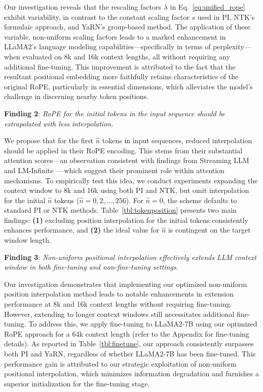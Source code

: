 Our investigation reveals that the rescaling factors $\lambda$ in Eq.~\ref{eq:unified_rope} exhibit variability, in contrast to the constant scaling factor $s$ used in PI, NTK's formulaic approach, and YaRN's group-based method. The application of these variable, non-uniform scaling factors leads to a marked enhancement in LLaMA2's language modeling capabilities—specifically in terms of perplexity—when evaluated on 8k and 16k context lengths, all without requiring any additional fine-tuning. This improvement is attributed to the fact that the resultant positional embedding more faithfully retains characteristics of the original RoPE, particularly in essential dimensions, which alleviates the model’s challenge in discerning nearby token positions.

\textbf{Finding 2}: \textit{RoPE for the initial tokens in the input sequence should be extrapolated with less interpolation.} 

We propose that for the first $\hat{n}$ tokens in input sequences, reduced interpolation should be applied in their RoPE encoding. This stems from their substantial attention scores—an observation consistent with findings from Streaming LLM~\cite{streamingllm} and LM-Infinite~\cite{han2023lminfinite}—which suggest their prominent role within attention mechanisms. To empirically test this idea, we conduct experiments expanding the context window to 8k and 16k using both PI and NTK, but omit interpolation for the initial $\hat n$ tokens ($\hat n = 0, 2, \ldots, 256$). For $\hat n = 0$, the scheme defaults to standard PI or NTK methods. Table~\ref{tbl:tokenposition} presents two main findings: \textbf{(1)} excluding position interpolation for the initial tokens consistently enhances performance, and \textbf{(2)} the ideal value for $\hat n$ is contingent on the target window length.

\textbf{Finding 3}: \textit{Non-uniform positional interpolation effectively extends LLM context window in both fine-tuning and non-fine-tuning settings.} 

Our investigation demonstrates that implementing our optimized non-uniform position interpolation method leads to notable enhancements in extension performance at 8k and 16k context lengths without requiring fine-tuning. However, extending to longer context windows still necessitates additional fine-tuning. To address this, we apply fine-tuning to LLaMA2-7B using our optimized RoPE approach for a 64k context length (refer to the Appendix for fine-tuning details). As reported in Table~\ref{tbl:finetune}, our approach consistently surpasses both PI and YaRN, regardless of whether LLaMA2-7B has been fine-tuned. This performance gain is attributed to our strategic exploitation of non-uniform positional interpolation, which minimizes information degradation and furnishes a superior initialization for the fine-tuning stage.

